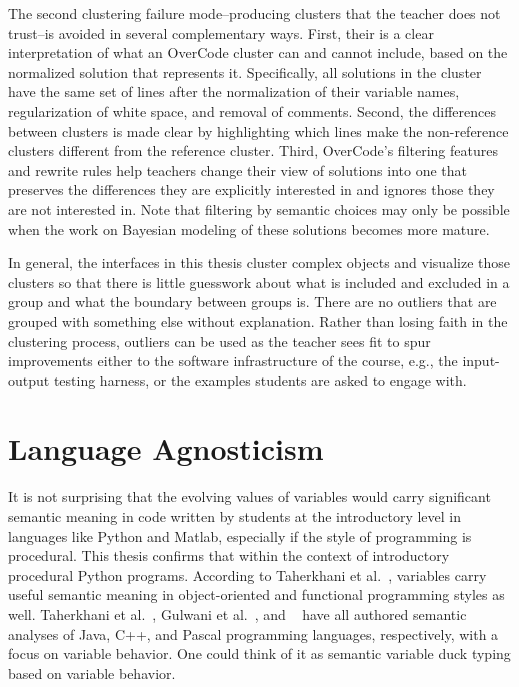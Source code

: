 

The second clustering failure mode--producing clusters that the teacher does not trust--is avoided in several complementary ways. First, their is a clear interpretation of what an OverCode cluster can and cannot include, based on the normalized solution that represents it. Specifically, all solutions in the cluster have the same set of lines after the normalization of their variable names, regularization of white space, and removal of comments. Second, the differences between clusters is made clear by highlighting which lines make the non-reference clusters different from the reference cluster. Third, OverCode's filtering features and rewrite rules help teachers change their view of solutions into one that preserves the differences they are explicitly interested in and ignores those they are not interested in. Note that filtering by semantic choices may only be possible when the work on Bayesian modeling of these solutions becomes more mature. 


In general, the interfaces in this thesis cluster complex objects and visualize those clusters so that there is little guesswork about what is included and excluded in a group and what the boundary between groups is. There are no outliers that are grouped with something else without explanation. Rather than losing faith in the clustering process, outliers can be used as the teacher sees fit to spur improvements either to the software infrastructure of the course, e.g., the input-output testing harness, or the examples students are asked to engage with. 

\section{Language Agnosticism}

It is not surprising that the evolving values of variables would carry significant semantic meaning in code written by students at the introductory level in languages like Python and Matlab, especially if the style of programming is procedural. This thesis confirms that within the context of introductory procedural Python programs. According to Taherkhani et al.~\cite{taherkhani2010recognizing}, variables carry useful semantic meaning in object-oriented and functional programming styles as well. Taherkhani et al.~\cite{}, Gulwani et al.~\cite{gulwani_fse14}, and ~\cite{sajaniemi2002empirical} have all authored semantic analyses of Java, C++, and Pascal programming languages, respectively, with a focus on variable behavior. One could think of it as semantic variable duck typing based on variable behavior. 

